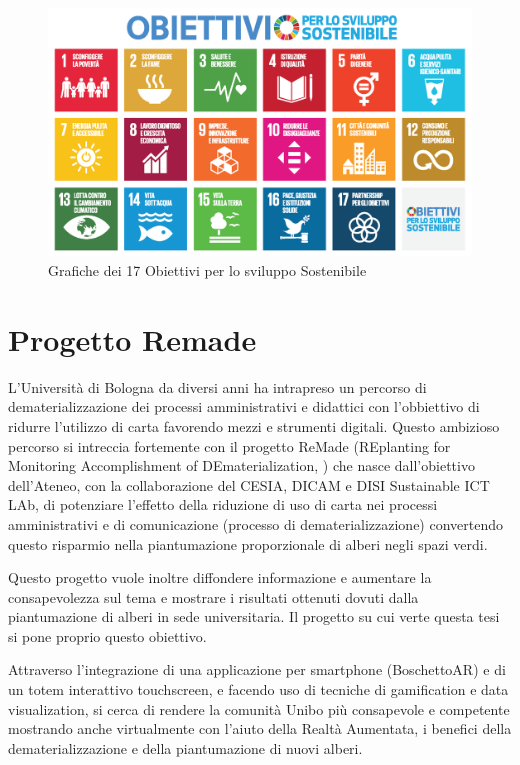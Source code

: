 \begin{figure}[h]
    \centering
    \includegraphics[width=\textwidth]{img/SDG_Poster.png}
    \caption{Grafiche dei 17 Obiettivi per lo sviluppo Sostenibile}
    \label{fig:sdgs}
\end{figure}
%
%
\section{Progetto Remade}
L'Università di Bologna da diversi anni ha intrapreso un percorso di dematerializzazione dei processi amministrativi e didattici con l'obbiettivo di ridurre l'utilizzo di carta favorendo mezzi e strumenti digitali.
%
Questo ambizioso percorso si intreccia fortemente con il progetto ReMade (REplanting for Monitoring Accomplishment of DEmaterialization, \cite{remade_project}) che nasce dall'obiettivo dell'Ateneo, con la collaborazione del CESIA, DICAM e DISI Sustainable ICT LAb, di potenziare l'effetto della riduzione di uso di carta nei processi amministrativi e di comunicazione (processo di dematerializzazione) convertendo questo risparmio nella piantumazione proporzionale di alberi negli spazi verdi.

Questo progetto vuole inoltre diffondere informazione e aumentare la consapevolezza sul tema e mostrare i risultati ottenuti dovuti dalla piantumazione di alberi in sede universitaria. Il progetto su cui verte questa tesi si pone proprio questo obiettivo.

Attraverso l'integrazione di una applicazione per smartphone (BoschettoAR) e di un totem interattivo touchscreen, e facendo uso di tecniche di gamification e data visualization, si cerca di rendere la comunità Unibo più consapevole e competente mostrando anche virtualmente con l'aiuto della Realtà Aumentata, i benefici della dematerializzazione e della piantumazione di nuovi alberi.

